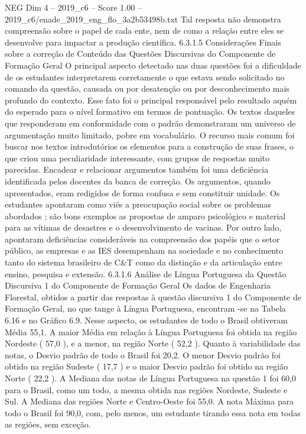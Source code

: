 \begin{textsample}{NEG Dim 4 – 2019\_c6 – Score 1.00 – 2019\_c6/enade\_2019\_eng\_flo\_3a2b53498b.txt}
Tal resposta não demonstra compreensão sobre o papel de cada ente, nem de como a relação entre eles se desenvolve para impactar a produção científica. 6.3.1.5 Considerações Finais sobre a correção de Conteúdo das Questões Discursivas do Componente de Formação Geral O principal aspecto detectado nas duas questões foi a dificuldade de os estudantes interpretarem corretamente o que estava sendo solicitado no comando da questão, causada ou por desatenção ou por desconhecimento mais profundo do contexto.
Esse fato foi o principal responsável pelo resultado aquém do esperado para o nível formativo em termos de pontuação.
Os textos daqueles que responderam em conformidade com o padrão demonstraram um universo de argumentação muito limitado, pobre em vocabulário.
O recurso mais comum foi buscar nos textos introdutórios os elementos para a construção de suas frases, o que criou uma peculiaridade interessante, com grupos de respostas muito parecidas.
Encadear e relacionar argumentos também foi uma deficiência identificada pelos docentes da banca de correção.
Os argumentos, quando apresentados, eram redigidos de forma confusa e sem constituir unidade.
Os estudantes apontaram como viés a preocupação social sobre os problemas abordados ; são bons exemplos as propostas de amparo psicológico e material para as vítimas de desastres e o desenvolvimento de vacinas.
Por outro lado, apontaram deficiências consideráveis na compreensão dos papéis que o setor público, as empresas e as IES desempenham na sociedade e no conhecimento tanto do sistema brasileiro de C\&T como da distinção e da articulação entre ensino, pesquisa e extensão. 6.3.1.6 Análise de Língua Portuguesa da Questão Discursiva 1 do Componente de Formação Geral Os dados de Engenharia Florestal, obtidos a partir das respostas à questão discursiva 1 do Componente de Formação Geral, no que tange à Língua Portuguesa, encontram -se na Tabela 6.16 e no Gráfico 6.9.
Nesse aspecto, os estudantes de todo o Brasil obtiveram Média 55,1.
A maior Média em relação à Língua Portuguesa foi obtida na região Nordeste ( 57,0 ), e a menor, na região Norte ( 52,2 ).
Quanto à variabilidade das notas, o Desvio padrão de todo o Brasil foi 20,2.
O menor Desvio padrão foi obtido na região Sudeste ( 17,7 ) e o maior Desvio padrão foi obtido na região Norte ( 22,2 ).
A Mediana das notas de Língua Portuguesa na questão 1 foi 60,0 para o Brasil, como um todo, a mesma obtida nas regiões Nordeste, Sudeste e Sul.
A Mediana das regiões Norte e Centro-Oeste foi 55,0.
A nota Máxima para todo o Brasil foi 90,0, com, pelo menos, um estudante tirando essa nota em todas as regiões, sem exceção.

\end{textsample}
